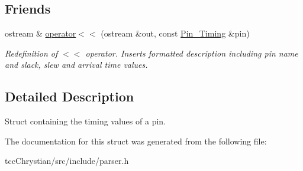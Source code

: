 \subsection*{Friends}
\begin{DoxyCompactItemize}
\item 
\hypertarget{structPrime__Time__Output__Parser_1_1Pin__Timing_a8ea07e765281219a4b6c4adf6c2274ea}{ostream \& \hyperlink{structPrime__Time__Output__Parser_1_1Pin__Timing_a8ea07e765281219a4b6c4adf6c2274ea}{operator$<$$<$} (ostream \&out, const \hyperlink{structPrime__Time__Output__Parser_1_1Pin__Timing}{Pin\-\_\-\-Timing} \&pin)}\label{structPrime__Time__Output__Parser_1_1Pin__Timing_a8ea07e765281219a4b6c4adf6c2274ea}

\begin{DoxyCompactList}\small\item\em Redefinition of $<$$<$ operator. Inserts formatted description including pin name and slack, slew and arrival time values. \end{DoxyCompactList}\end{DoxyCompactItemize}


\subsection{Detailed Description}
Struct containing the timing values of a pin. 

The documentation for this struct was generated from the following file\-:\begin{DoxyCompactItemize}
\item 
tcc\-Chrystian/src/include/parser.\-h\end{DoxyCompactItemize}
